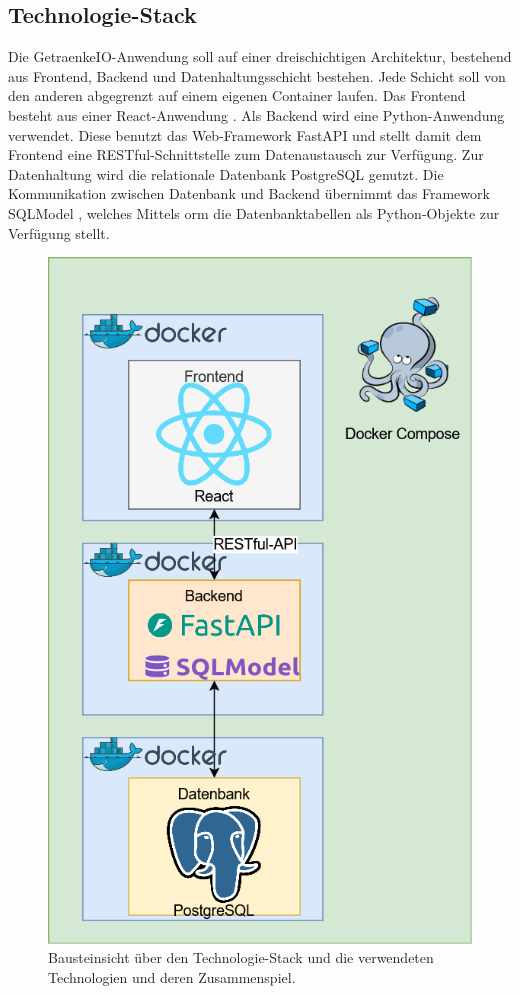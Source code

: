 \documentclass[conference,a4paper]{cs-techrep}
\begin{document}
\subsection{Technologie-Stack} %
Die GetraenkeIO-Anwendung soll auf einer dreischichtigen Architektur, bestehend aus Frontend, Backend und Datenhaltungsschicht bestehen.
Jede Schicht soll von den anderen abgegrenzt auf einem eigenen Container \cite{conatiners} laufen.
Das Frontend besteht aus einer React-Anwendung \cite{react}.
Als Backend wird eine Python-Anwendung \cite{python} verwendet.
Diese benutzt das Web-Framework FastAPI \cite{fastapi} und stellt damit dem Frontend eine RESTful-Schnittstelle \cite{restful} zum Datenaustausch zur Verfügung.
Zur Datenhaltung wird die relationale Datenbank PostgreSQL \cite{postgresql} genutzt.
Die Kommunikation zwischen Datenbank und Backend übernimmt das Framework SQLModel \cite{sqlmodel}, welches Mittels \ac{orm} die Datenbanktabellen als Python-Objekte zur Verfügung stellt.

\begin{figure}
	\centering
	\includegraphics[width=0.9\linewidth]{Bausteinsicht-Architektur.drawio}
	\caption{Bausteinsicht über den Technologie-Stack und die verwendeten Technologien und deren Zusammenspiel.}
	\label{fig:bausteinsicht-architektur}
\end{figure}
\end{document}
